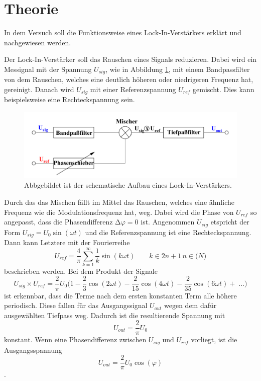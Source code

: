 \section{Theorie \cite{V303}}
\label{Zielsetzung}
In dem Versuch soll die Funktionsweise eines Lock-In-Verstärkers erklärt und nachgewiesen werden.

\label{sec:Theorie}

Der Lock-In-Verstärker soll das Rauschen eines Signals reduzieren.
Dabei wird ein Messignal mit der Spannung $U_{sig}$, wie in Abbildung \ref{fig:schema}, mit einem Bandpassfilter von dem Rauschen, welches eine deutlich höheren oder niedrigeren Frequenz hat, gereinigt.
Danach wird $U_{sig}$ mit einer Referenzspannung $U_{ref}$ gemischt.
Dies kann beispielsweise eine Rechteckspannung sein.


\begin{figure}[H]
    \caption{Abbgebildet ist der schematische Aufbau eines Lock-In-Verstärkers.}
    \label{fig:schema}
    \includegraphics{Bilder/schema.png}
\end{figure}

\noindent Durch das das Mischen fällt im Mittel das Rauschen, welches eine ähnliche Frequenz wie die Modulationsfrequenz hat, weg.
Dabei wird die Phase von $U_{ref}$ so angepasst, dass die Phasendifferenz $\increment \varphi=0$ ist.
Angenommen $U_{sig}$ etspricht der Form $U_{sig}=U_0 \sin(\omega t)$ und die Referenzspannung ist eine Rechteckspannung.
Dann kann Letztere mit der Fourierreihe 
\begin{equation}
    U_{ref}=\frac{4}{\pi} \sum_{k=1}^\infty \frac{1}{k}\sin(k\omega t) \qquad k \in 2n+1 \, n \in \mathbb(N)
    \label{eqn:Fourier}
\end{equation}
beschrieben werden.
Bei dem Produkt der Signale 
\begin{equation}
    U_{sig} \times U_{ref}=\frac{2}{\pi}U_0 \biggl(1-\frac{2}{3}\cos(2\omega t)-\frac{2}{15}\cos(4\omega t)- \frac{2}{35}\cos(6 \omega t)+ \; ...\biggr)
    \label{eqn:Produkt}
\end{equation}
ist erkennbar, dass die Terme nach dem ersten konstanten Term alle höhere periodisch.
Diese fallen für das Ausgangssignal $U_{out}$ wegen dem dafür ausgewählten Tiefpass weg.
Dadurch ist die resultierende Spannung mit
\begin{equation}
    U_{out}=\frac{2}{\pi}U_0
    \label{eqn:konst}
\end{equation}
konstant.
Wenn eine Phasendifferenz zwischen $U_{sig}$ und $U_{ref}$ vorliegt, ist die Ausgangsspannung 
\begin{equation}
    U_{out}=\frac{2}{\pi}U_0 \cos(\varphi)
    \label{eqn:cos}
\end{equation}.
